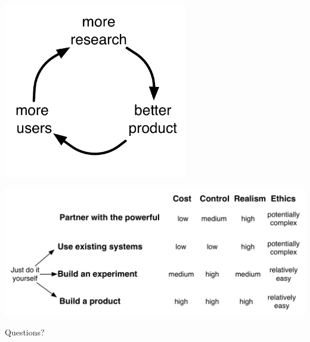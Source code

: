 \documentclass[aspectratio=169]{beamer}
\begin{document}
\begin{frame}

\begin{center}
\includegraphics[width=0.6\textwidth]{figures/bitbybit4-16_build_your_own_product}
\end{center}

\end{frame}
\begin{frame}

\begin{center}
\includegraphics[width=\textwidth]{figures/exp_making_it_happen_slides_4}
\end{center}

\end{frame}
\begin{frame}

\begin{center}
\LARGE Questions?
\end{center}

\end{frame}
\end{document}
